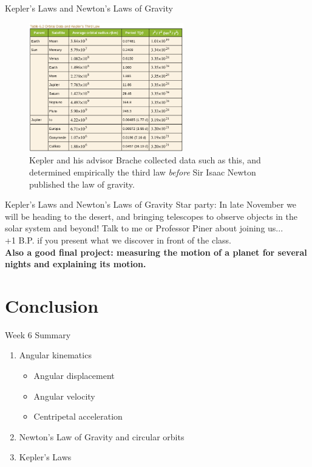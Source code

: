 \documentclass{beamer}
\begin{document}
\begin{frame}{Kepler's Laws and Newton's Laws of Gravity}
\begin{figure}
\centering
\includegraphics[width=0.6\textwidth]{figures/keplertable.png}
\caption{\label{fig:kepler3} Kepler and his advisor Brache collected data such as this, and determined empirically the third law \textit{before} Sir Isaac Newton published the law of gravity.}
\end{figure}
\end{frame}

\begin{frame}{Kepler's Laws and Newton's Laws of Gravity}
\alert{Star party}: In late November we will be heading to the desert, and bringing telescopes to observe objects in the solar system and beyond!  Talk to me or Professor Piner about joining us... \\ \vspace{0.5cm}
\alert{+1 B.P. if you present what we discover in front of the class.}
\\ \vspace{0.5cm}
\textbf{Also a good final project: measuring the motion of a planet for several nights and explaining its motion.}
\end{frame}

\section{Conclusion}

\begin{frame}{Week 6 Summary}
\begin{enumerate}
\item \alert{Angular} kinematics
\begin{itemize}
\item Angular displacement
\item Angular velocity
\item Centripetal acceleration
\end{itemize}
\item \alert{Newton's Law of Gravity} and circular orbits
\item Kepler's Laws
\end{enumerate}
\end{frame}
\end{document}
